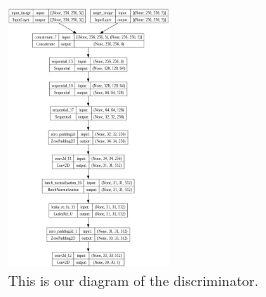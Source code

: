 \documentclass[conference]{IEEEtran}
\begin{document}
\begin{figure}[p]
\includegraphics[width=0.38\textwidth]{./discriminator.jpg}
  \caption{\label{fig:discriminator} This is our diagram of the discriminator.}
\centering
\end{figure}
\printbibliography
\end{document}
